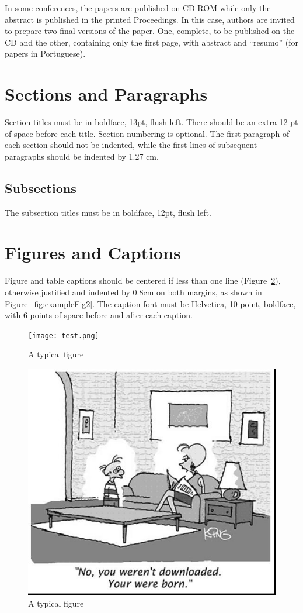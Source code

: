 \documentclass[12pt]{article}
\begin{document}
In some conferences, the papers are published on CD-ROM while only the
abstract is published in the printed Proceedings. In this case, authors are
invited to prepare two final versions of the paper. One, complete, to be
published on the CD and the other, containing only the first page, with
abstract and ``resumo'' (for papers in Portuguese).

\section{Sections and Paragraphs}

Section titles must be in boldface, 13pt, flush left. There should be an extra
12 pt of space before each title. Section numbering is optional. The first
paragraph of each section should not be indented, while the first lines of
subsequent paragraphs should be indented by 1.27 cm.

\subsection{Subsections}

The subsection titles must be in boldface, 12pt, flush left.

\section{Figures and Captions}\label{sec:figs}


Figure and table captions should be centered if less than one line
(Figure~\ref{fig:exampleFig1}), otherwise justified and indented by 0.8cm on
both margins, as shown in Figure~\ref{fig:exampleFig2}. The caption font must
be Helvetica, 10 point, boldface, with 6 points of space before and after each
caption.

\begin{figure}[ht]
\centering
\texttt{[image: test.png]}
\caption{A typical figure}
\label{fig:exampleFig3}
\end{figure}

\begin{figure}[ht]
\centering
\includegraphics[width=.5\textwidth]{fig1.jpg}
\caption{A typical figure}
\label{fig:exampleFig1}
\end{figure}
\end{document}
